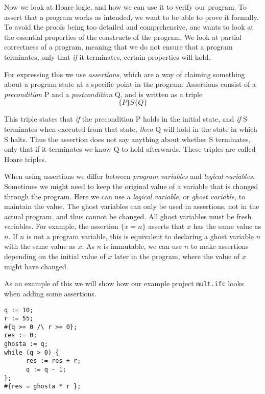 Now we look at Hoare logic, and how we can use it to verify our program.
To assert that a program works as intended, we want to be able to prove it formally. To avoid the proofs being too detailed and comprehensive, one wants to look at the essential properties of the constructs of the program. We look at partial correctness of a program, meaning that we do not ensure that a program terminates, only that \textit{if} it terminates, certain properties will hold.

For expressing this we use \textit{assertions}, which are a way of claiming something about a program state at a specific point in the program.
Assertions consist of a \textit{precondition} P and a \textit{postcondition} Q, and is written as a triple
$$ \{ P \} S \{ Q \} $$

This triple states that \textit{if} the precondition P holds in the initial state, and \textit{if} S terminates when executed from that state, \textit{then} Q will hold in the state in which S halts.
Thus the assertion does not say anything about whether S terminates, only that if it terminates we know Q to hold afterwards. These triples are called Hoare triples.

When using assertions we differ between \textit{program variables} and \textit{logical variables}.
Sometimes we might need to keep the original value of a variable that is changed through the program. Here we can use a \textit{logical variable}, or \textit{ghost variable}, to maintain the value. The ghost variables can only be used in assertions, not in the actual program, and thus cannot be changed. All ghost variables must be fresh variables. 
For example, the assertion $\{x = n\}$ asserts that $x$ has the same value as $n$. If $n$ is not a program variable, this is equivalent to declaring a ghost variable $n$ with the same value as $x$. As $n$ is immutable, we can use $n$ to make assertions depending on the initial value of $x$ later in the program, where the value of $x$ might have changed.

As an example of this we will show how our example project \texttt{mult.ifc} looks when adding some assertions.
\begin{lstlisting}[caption={Example program \texttt{mult.ifc}}, captionpos=b]
q := 10;
r := 55;
#{q >= 0 /\ r >= 0};
res := 0;
ghosta := q;
while (q > 0) {
      res := res + r;
      q := q - 1;
};
#{res = ghosta * r };
\end{lstlisting}
\label{figure:mult}

